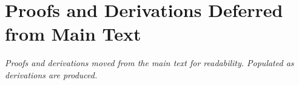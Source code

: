 \chapter{Proofs and Derivations Deferred from Main Text}
\label{app:proofs}

\textit{Proofs and derivations moved from the main text for readability.
Populated as derivations are produced.}